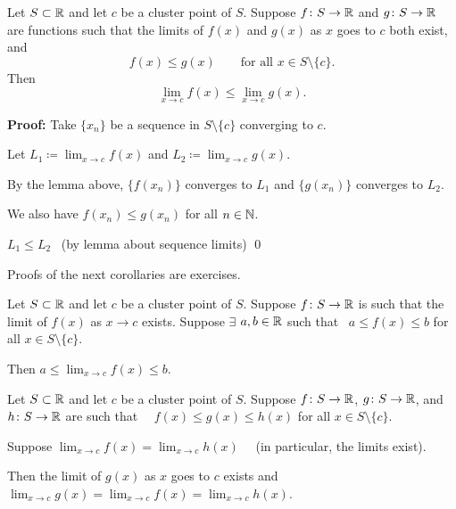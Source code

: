 \documentclass[10pt,aspectratio=169]{beamer}
\begin{document}
\begin{frame}

\begin{corollary}
Let $S \subset {\mathbb{R}}$ and let $c$ be a cluster point of $S$.  
Suppose $f \colon S \to
{\mathbb{R}}$ and $g \colon S \to {\mathbb{R}}$ are functions
such that
the limits of $f(x)$ and $g(x)$ as $x$ goes to $c$ both exist,
and
\begin{equation*}
f(x) \leq g(x) \qquad \text{for all } x \in S \setminus \{ c \}.
\end{equation*}
\pause
Then
\begin{equation*}
\lim_{x\to c} f(x) \leq \lim_{x\to c} g(x) .
\end{equation*}
\end{corollary}

\pause
\textbf{Proof:}
Take $\{ x_n \}$ be a sequence in $S \setminus \{ c \}$
converging to $c$.

\pause
\medskip

Let \quad
$\displaystyle L_1 \coloneqq \lim_{x\to c} f(x)$
\quad and \quad
$\displaystyle L_2 \coloneqq \lim_{x\to c} g(x)$.

\pause
\medskip

By the lemma above,
$\{ f(x_n) \}$ converges to $L_1$ and $\{ g(x_n) \}$ converges to $L_2$.

\pause
\medskip

We also have $f(x_n) \leq g(x_n)$ for all $n \in {\mathbb{N}}$.

\pause
\medskip

\thus \quad $L_1 \leq L_2$ ~(by lemma about sequence limits)
\qed
\end{frame}

\begin{frame}

Proofs of the next corollaries are exercises.

\pause
\begin{corollary}
Let $S \subset {\mathbb{R}}$ and let $c$ be a cluster point of $S$.  Suppose $f \colon S \to
{\mathbb{R}}$ is such that the limit of $f(x)$ as $x \to c$ exists.
Suppose $\exists$ $a,b \in {\mathbb{R}}$ such that
~$a \leq f(x) \leq b$ for all $x \in S \setminus \{ c \}$.

\pause
\medskip

Then \quad $\displaystyle a \leq \lim_{x\to c} f(x) \leq b$.
\end{corollary}

\pause
\begin{corollary}
Let $S \subset {\mathbb{R}}$ and let $c$ be a cluster point of $S$.
Suppose $f \colon S \to {\mathbb{R}}$,
$g \colon S \to {\mathbb{R}}$, and $h \colon S \to {\mathbb{R}}$ are such that
~~$f(x) \leq g(x) \leq h(x)$ for all $x \in S \setminus \{ c \}$.

\pause
\medskip

Suppose $\displaystyle \lim_{x\to c} f(x) = \lim_{x\to c} h(x)$
~~(in particular, the limits exist).

\pause
\medskip

Then the limit of $g(x)$ as $x$ goes to $c$ exists and
~~$\displaystyle \lim_{x\to c} g(x) =
\lim_{x\to c} f(x) = \lim_{x\to c} h(x)$.
\end{corollary}

\end{frame}
\end{document}
